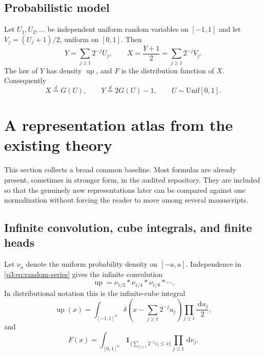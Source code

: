 \documentclass[11pt]{article}
\theoremstyle{definition}
\theoremstyle{remark}
\newcommand{\N}{\mathbb N}
\newcommand{\dd}{\,\mathrm d}
\newcommand{\Up}{\operatorname{up}}
\newcommand{\one}{\mathbf 1}
\begin{document}
\subsection{Probabilistic model}

Let $U_1,U_2,\ldots$ be independent uniform random variables on $[-1,1]$ and
let $V_j=(U_j+1)/2$, uniform on $[0,1]$.  Then
\begin{equation}\label{p3:eq:random-series}
 Y=\sum_{j\ge1}2^{-j}U_j,\qquad
 X=\frac{Y+1}{2}=\sum_{j\ge1}2^{-j}V_j.
\end{equation}
The law of $Y$ has density $\Up$, and $F$ is the distribution function of $X$.
Consequently
\begin{equation}\label{p3:eq:quantile-push}
 X\overset d=G(U),\qquad
 Y\overset d=2G(U)-1,
 \qquad U\sim\mathrm{Unif}[0,1].
\end{equation}

\section{A representation atlas from the existing theory}
\label{p3:sec:atlas}

This section collects a broad common baseline.  Most formulas are already
present, sometimes in stronger form, in the audited repository.  They are
included so that the genuinely new representations later can be compared
against one normalization without forcing the reader to move among several
manuscripts.

\subsection{Infinite convolution, cube integrals, and finite heads}

Let $\nu_a$ denote the uniform probability density on $[-a,a]$.
Independence in \eqref{p3:eq:random-series} gives the infinite convolution
\begin{equation}\label{p3:eq:infinite-convolution}
 \Up=\nu_{1/2}*\nu_{1/4}*\nu_{1/8}*\cdots.
\end{equation}
In distributional notation this is the infinite-cube integral
\begin{equation}\label{p3:eq:delta-cube}
 \Up(x)=\int_{[-1,1]^{\N}}
 \delta\!\left(x-\sum_{j\ge1}2^{-j}u_j\right)
 \prod_{j\ge1}\frac{\dd u_j}{2},
\end{equation}
and
\begin{equation}\label{p3:eq:F-cube}
 F(x)=\int_{[0,1]^{\N}}
 \one_{\{\sum_{j\ge1}2^{-j}v_j\le x\}}
 \prod_{j\ge1}\dd v_j.
\end{equation}
\end{document}
